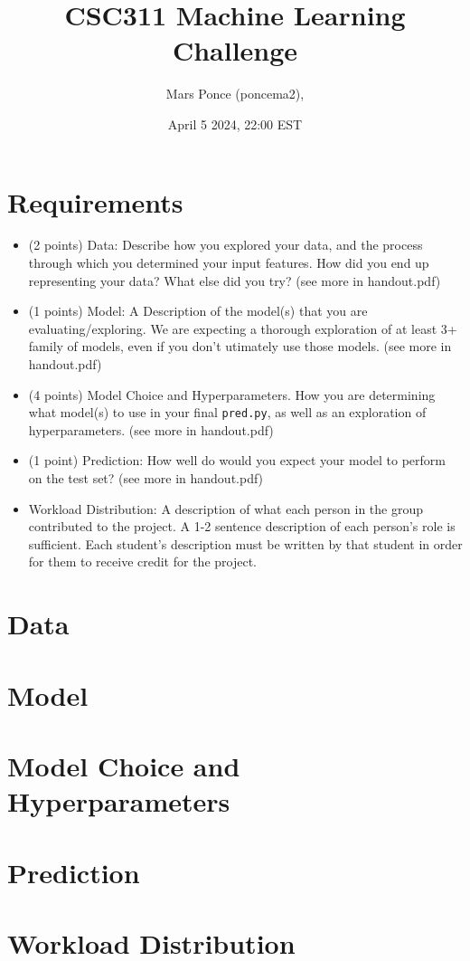 \documentclass{article}
\title{CSC311 Machine Learning Challenge}
\author{Mars Ponce (poncema2), } %
\date{April 5 2024, 22:00 EST}
\begin{document}
\maketitle

\newpage

\section*{Requirements}
\begin{itemize}
	\item (2 points) Data: Describe how you explored your data, and the process through which you determined your input features. How did you end up representing your data? What else did you try? (see more in handout.pdf)
	\item (1 points) Model: A Description of the model(s) that you are evaluating/exploring. We are expecting a thorough exploration of at least 3+ family of models, even if you don't utimately use those models. (see more in handout.pdf) 
	\item (4 points) Model Choice and Hyperparameters. How you are determining what model(s) to use in your final \verb|pred.py|, as well as an exploration of hyperparameters. (see more in handout.pdf)
	\item (1 point) Prediction: How well do would you expect your model to perform on the test set? (see more in handout.pdf)
	\item Workload Distribution: A description of what each person in the group contributed to the project. A 1-2 sentence description of each person’s role is sufficient. Each student’s description must be written by that student in order for them to receive credit for the project.
\end{itemize}

\section{Data}

\section{Model}

\section{Model Choice and Hyperparameters}

\section{Prediction}

\section{Workload Distribution}
\end{document}
